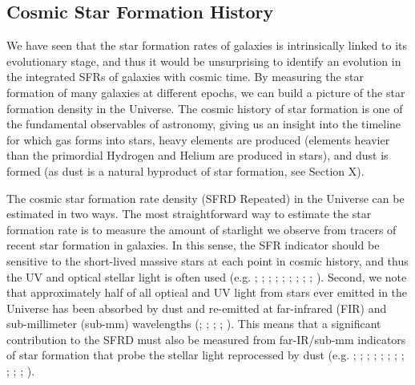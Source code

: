 \subsection{Cosmic Star Formation History}
\label{sec:cosmic_star_formation_history}

We have seen that the star formation rates of galaxies is intrinsically linked to its evolutionary stage, and thus it would be unsurprising to identify an evolution in the integrated SFRs of galaxies with cosmic time. By measuring the star formation of many galaxies at different epochs, we can build a picture of the star formation density in the Universe. The cosmic history of star formation is one of the fundamental observables of astronomy, giving us an insight into the timeline for which gas forms into stars, heavy elements are produced (elements heavier than the primordial Hydrogen and Helium are produced in stars), and dust is formed (as dust is a natural byproduct of star formation, see Section {\color{red}X}).

The cosmic star formation rate density (SFRD {\color{red}Repeated}) in the Universe can be estimated in two ways. The most straightforward way to estimate the star formation rate is to measure the amount of starlight we observe from tracers of recent star formation in galaxies. In this sense, the SFR indicator should be sensitive to the short-lived massive stars at each point in cosmic history, and thus the UV and optical stellar light is often used (e.g. \citealt{Madau_1996}; \citealt{Lilly_1996}; \citealt{Wyder_2005}; \citealt{Schiminovich_2005}; \citealt{Dahlen_2007}; \citealt{Reddy_2009}; \citealt{Robotham_2011}; \citealt{Cucciati_2012}; \citealt{Schenker_2013}; \citealt{Finkelstein_2015}). Second, we note that approximately half of all optical and UV light from stars ever emitted in the Universe has been absorbed by dust and re-emitted at far-infrared (FIR) and sub-millimeter (sub-mm) wavelengths (\citealt{Puget_1996}; \citealt{Fixsen_1998}; \citealt{Dole_2006}; \citealt{Driver_2008}; \citealt{Driver_2016}). This means that a significant contribution to the SFRD must also be measured from far-IR/sub-mm indicators of star formation that probe the stellar light reprocessed by dust (e.g. \citealt{Magnelli_2011}; \citealt{Casey_2012}; \citealt{Magnelli_2013}; \citealt{Gruppioni_2013}; \citealt{Swinbank_2014}; \citealt{Bouwens_2016}; \citealt{Bourne_2017}; \citealt{Koprowski_2017}; \citealt{Novak_2017}; \citealt{Liu_2018}; \citealt{Bouwens_2020}; \citealt{Dudzeviciute_2020}).

